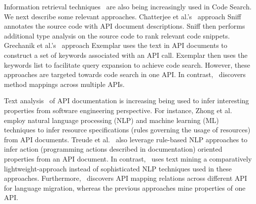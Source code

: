 

Information retrieval techniques~\cite{chatterjee2009sniff,grechanik2010search,kim2010towards,Reiss2009SCS} are also being increasingly used in Code Search. We next describe some relevant approaches.
Chatterjee et al.'s~\cite{chatterjee2009sniff} approach Sniff annotates the source code with API document descriptions. 
Sniff then performs additional type analysis on the source code to rank relevant code snippets. 
Grechanik et al.'s~\cite{grechanik2010search} approach Exemplar uses the text in API documents to construct a set of keywords associated with an API call.
Exemplar then uses the keywords list to facilitate query expansion to achieve code search.
However, these approaches are targeted towards code search in one API.
In contrast, \tool\ discovers method mappings across multiple APIs. 


Text analysis~\cite{Dekel2009, pandita12:inferring,Zhou2008,Little2009, zhong09SE} of API documentation is increasing being used to infer interesting properties from software engineering perspective.
For instance, Zhong et al.~\cite{zhong09SE} employ natural language processing (NLP) and machine learning (ML) techniques to infer resource specifications (rules governing the usage of resources) from API documents.
Treude et al.~\cite{treudeextracting} also leverage rule-based NLP approaches to infer action (programming actions described in documentation) oriented properties from an API document.
In contrast, \tool\ uses text mining a comparatively lightweight-approach instead of sophisticated NLP techniques used in these approaches.
Furthermore, \tool\ discovers API mapping relations across different API for language migration, whereas the previous approaches mine properties of one API.


